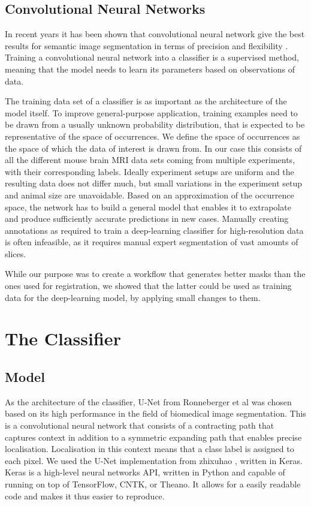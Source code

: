 \documentclass{article}
\begin{document}
\subsection{Convolutional Neural Networks} \label{sec:Convolutional Neural Networks}
In recent years it has been shown that convolutional neural network give the best results for semantic image segmentation in terms of precision and flexibility \cite{geng_survey_2018} \cite{ronneberger_u-net:_2015}.
Training a convolutional neural network into a classifier is a supervised method, meaning that the model needs to learn its parameters based on observations of data.

The training data set of a classifier is as important as the architecture of the model itself.
To improve general-purpose application, training examples need to be drawn from a usually unknown probability distribution, that is expected to be representative of the space of occurrences.
We define the space of occurrences as the space of which the data of interest is drawn from.
In our case this consists of all the different mouse brain MRI data sets coming from multiple experiments, with their corresponding labels. 
Ideally experiment setups are uniform and the resulting data does not differ much, but small variations in the experiment setup and animal size are unavoidable.
Based on an approximation of the occurrence space, the network has to build a general model that enables it to extrapolate and produce sufficiently accurate predictions in new cases.
Manually creating annotations as required to train a deep-learning classifier for high-resolution data is often infeasible, as it requires manual expert segmentation of vast amounts of slices.

While our purpose was to create a workflow that generates better masks than the ones used for registration, we showed that the latter could be used as training data for the deep-learning model, by applying small changes to them.

\section{The Classifier}
\subsection{Model}
As the architecture of the classifier, U-Net from Ronneberger et al \cite{ronneberger_u-net:_2015} was chosen based on its high performance in the field of biomedical image segmentation.
This is a convolutional neural network that consists of a contracting path that captures context in addition to a symmetric expanding path that enables precise localisation.
Localisation in this context means that a class label is assigned to each pixel.
We used the U-Net implementation from zhixuhao \cite{zhixuhao_zhixuhao/unet_2020}, written in Keras.
Keras is a high-level neural networks API, written in Python and capable of running on top of TensorFlow, CNTK, or Theano.
It allows for a easily readable code and makes it thus easier to reproduce.
\end{document}
